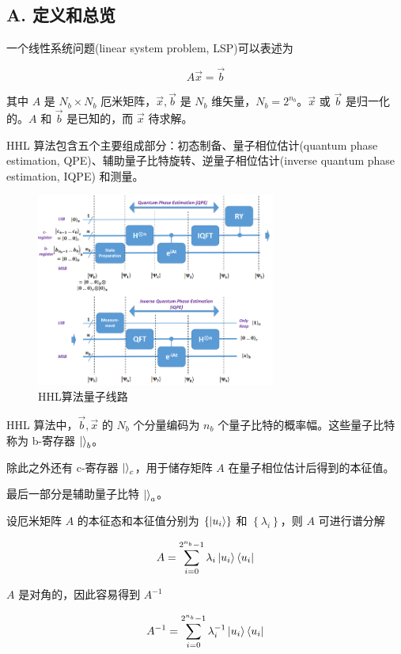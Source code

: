 \documentclass[aps,prl,twocolumn,groupedaddress]{revtex4-2}
\begin{document}
\subsection{A. 定义和总览}

一个线性系统问题(linear system problem, LSP)可以表述为

$$
A\vec{x} = \vec{b}
$$

其中 $A $ 是  $N_b\times N_b$ 厄米矩阵，$\vec{x},\vec{b}$ 是 $N_b$ 维矢量，$N_b=2^{n_b}$。$\vec{x}$ 或 $\vec{b}$ 是归一化的。$A$ 和 $\vec{b}$ 是已知的，而 $\vec{x}$ 待求解。

HHL 算法包含五个主要组成部分：初态制备、量子相位估计(quantum phase estimation, QPE)、辅助量子比特旋转、逆量子相位估计(inverse quantum phase estimation, IQPE) 和测量。

\begin{figure}[htbp]
    \centering
    \includegraphics[width=0.70\textwidth]{fig/fig1.png}
    \caption{HHL算法量子线路}
    \label{fig1}
\end{figure}

HHL 算法中，$\vec{b},\vec{x} $ 的 $N_b$ 个分量编码为 $n_b$ 个量子比特的概率幅。这些量子比特称为 b-寄存器 $\ket{}_b$。

除此之外还有 c-寄存器 $\ket{}_c$，用于储存矩阵 $A$ 在量子相位估计后得到的本征值。

最后一部分是辅助量子比特 $\ket{}_a$。

设厄米矩阵 $A$ 的本征态和本征值分别为 $\left\{\ket{u_i} \right\}$ 和 $\left\{\lambda_i \right\}$，则 $A$ 可进行谱分解

$$
A = \sum_{i=0}^{2^{n_b}-1} \lambda_i \ket{u_i}\bra{u_i}
$$

$A$ 是对角的，因此容易得到 $A^{-1}$

$$
A^{-1} = \sum_{i=0}^{2^{n_b}-1} \lambda_i^{-1} \ket{u_i}\bra{u_i}
$$
\end{document}
